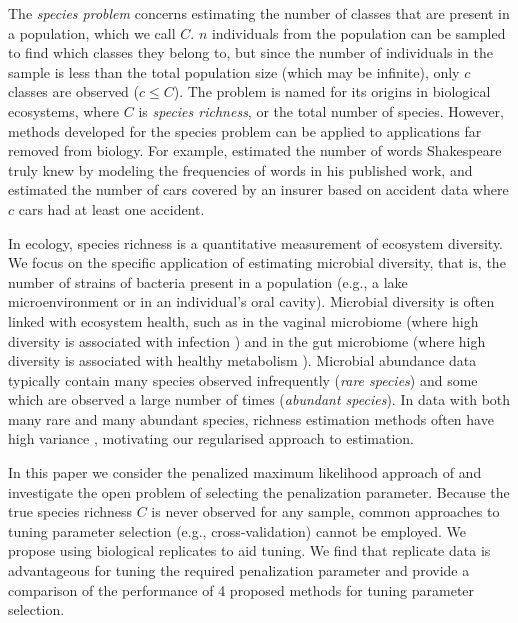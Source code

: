 \documentclass[oupdraft]{bio}
\begin{document}
The \textit{species problem} concerns estimating the number of classes that are present in a population, which we call $C$.
$n$ individuals from the population can be sampled to find which classes they belong to, but since the  number of individuals in the sample is less than the total population size (which may be infinite), only $c$ classes are observed ($c \leq C$). The problem is named for its origins in biological ecosystems, where $C$ is \textit{species richness}, or the total number of species.  However, methods developed for the species problem can be applied to applications far removed from biology.  For example, \citet{efron_1976} estimated the number of words Shakespeare truly knew by modeling the frequencies of words in his published work, and  \citet{fegatelli_2018} estimated the number of cars covered by an insurer based on accident data where $c$ cars had at least one accident.

In ecology, species richness is a quantitative measurement of ecosystem diversity.  We focus on the specific application of estimating microbial diversity, that is, the number of strains of bacteria present in a population (e.g., a lake microenvironment or in an individual's oral cavity).
Microbial diversity is often linked with ecosystem health, such as in the vaginal microbiome (where high diversity is associated with infection \citep{Oakley:2008uo}) and in the gut microbiome (where high diversity is associated with healthy metabolism \citep{Morgan:2012bm,Minot:2019hc}).
Microbial abundance data typically contain many species observed infrequently (\textit{rare species}) and some which are observed a large number of times (\textit{abundant species}).  In data with both many rare and many abundant species, richness estimation methods often have high variance \citep{wang_2005,willis_2015}, motivating our regularised approach to estimation.

In this paper we consider the penalized maximum likelihood approach of \citet{wang_2005} and investigate the open problem of selecting the penalization parameter. Because the true species richness $C$ is never observed for any sample, common approaches to tuning parameter selection (e.g., cross-validation) cannot be employed. We propose using biological replicates to aid tuning. %
We find that replicate data is advantageous for tuning the required penalization parameter and provide a comparison of the performance of 4 proposed methods for tuning parameter selection.
\end{document}
